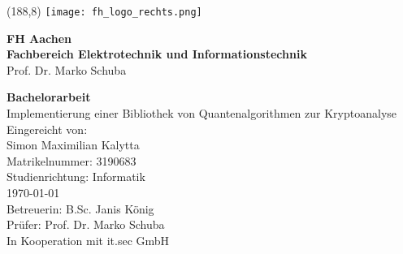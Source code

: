 \begin{titlepage}

\thispagestyle{empty}%
\setlength{\oddsidemargin}{0cm}%
\enlargethispage{\baselineskip}
\begin{textblock}{20}(188,8)%
    \texttt{[image: fh\_logo\_rechts.png]}%
 \end{textblock}%
\vspace*{-1.0cm}
\noindent
\LARGE\textbf{FH Aachen}\\
\Large\textbf{Fachbereich Elektrotechnik und Informationstechnik}\\
\large Prof. Dr. Marko Schuba
\vspace{2cm}
\begin{center}
	\LARGE\textbf{Bachelorarbeit}\\
	\vspace{1.75cm}
	\LARGE Implementierung einer Bibliothek von Quantenalgorithmen zur Kryptoanalyse\\
	\large
	\vspace{2.5cm}
	Eingereicht von:\\
	Simon Maximilian Kalytta\\
	Matrikelnummer: 3190683\\
	\vspace{1cm}
	Studienrichtung: Informatik\\
	\vspace{1cm}
	\today\\
	\vspace{1.5cm}
	Betreuerin: B.Sc. Janis König\\
	Prüfer: Prof. Dr. Marko Schuba\\
        \vspace{0.5cm}
        In Kooperation mit it.sec GmbH
\end{center}
\end{titlepage}